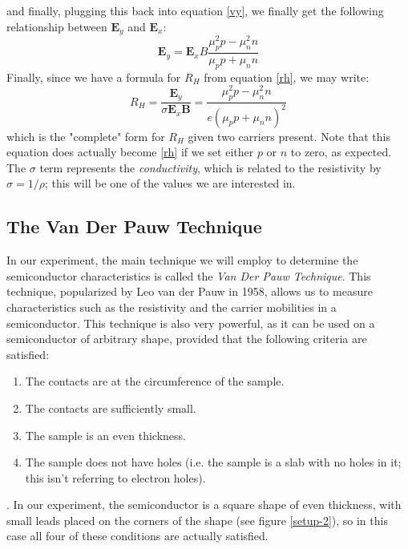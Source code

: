 \documentclass[10pt]{article}
\begin{document}
	and finally, plugging this back into equation \ref{vy}, we finally get the following relationship between
	\( \mathbf{E}_y \) and \( \mathbf{E}_x \):
	\[
		\mathbf{E}_y = \mathbf{E}_x B \frac{\mu_p^2 p - \mu_n^2 n}{\mu_p p + \mu_n n}
	\]
	Finally, since we have a formula for \( R_H \) from equation \ref{rh}, we may write:
	\[
		R_H = \frac{\mathbf{E}_y}{\sigma \mathbf{E}_x \mathbf{B}} = \frac{\mu_p^2 p - \mu_n^2 n}{e(\mu_p p +
		\mu_n n)^2}
	\]
	which is the "complete" form for \( R_H \) given two carriers present. Note that this equation does
	actually become \ref{rh} if we set either \( p \) or \( n \) to zero, as expected. The \( \sigma \) term
	represents the \textit{conductivity}, which is related to the resistivity by \( \sigma = 1 / \rho \);
	this will be one of the values we are interested in.
	\subsection{The Van Der Pauw Technique}
	In our experiment, the main technique we will employ to determine the semiconductor characteristics is
	called the \textit{Van Der Pauw Technique}. This technique, popularized by Leo van der Pauw in 1958,
	allows us to measure characteristics such as the resistivity and the carrier mobilities in a
	semiconductor. This technique is also very powerful, as it can be used on a semiconductor of arbitrary
	shape, provided that the following criteria are satisfied:
	\begin{enumerate}[label=\arabic*.]
		\item The contacts are at the circumference of the sample.
		\item The contacts are sufficiently small.
		\item The sample is an even thickness.
		\item The sample does not have holes (i.e. the sample is a slab with no holes in it; this isn't
			referring to electron holes).
	\end{enumerate}
	\cite{vdp}. 
	In our experiment, the semiconductor is a square shape of even thickness, with small leads placed on the
	corners of the shape (see figure \ref{setup-2}), 
	so in this case all four of these conditions are actually satisfied. 
\end{document}
